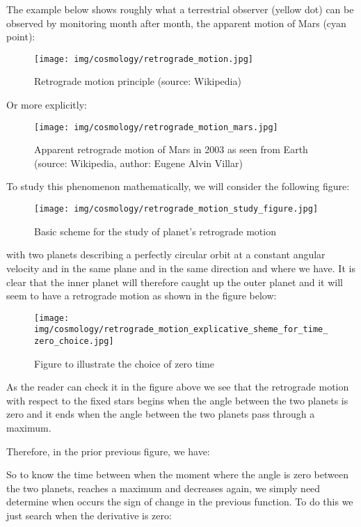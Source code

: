 	The example below shows roughly what a terrestrial observer (yellow dot) can be observed by monitoring month after month, the apparent motion of Mars (cyan point):
	\begin{figure}[H]
		\begin{center}
		\texttt{[image: img/cosmology/retrograde\_motion.jpg]}
		\end{center}	
		\caption[Retrograde motion principle]{Retrograde motion principle (source: Wikipedia)}
	\end{figure}
	Or more explicitly:
	\begin{figure}[H]
		\begin{center}
		\texttt{[image: img/cosmology/retrograde\_motion\_mars.jpg]}
		\end{center}	
		\caption[Apparent retrograde motion of Mars in 2003 as seen from Earth]{Apparent retrograde motion of Mars in 2003 as seen from Earth (source: Wikipedia, author: Eugene Alvin Villar)}
	\end{figure}
	To study this phenomenon mathematically, we will consider the following figure:
	\begin{figure}[H]
		\begin{center}
		\texttt{[image: img/cosmology/retrograde\_motion\_study\_figure.jpg]}
		\end{center}	
		\caption{Basic scheme for the study of planet's retrograde motion}
	\end{figure}
	with two planets describing a perfectly circular orbit at a constant angular velocity and in the same plane and in the same direction and where we have. It is clear that the inner planet will therefore caught up the outer planet and it will seem to have a retrograde motion as shown in the figure below:
	\begin{figure}[H]
		\begin{center}
		\texttt{[image: img/cosmology/retrograde\_motion\_explicative\_sheme\_for\_time\_zero\_choice.jpg]}
		\end{center}	
		\caption[]{Figure to illustrate the choice of zero time}
	\end{figure}
	As the reader can check it in the figure above we see that the retrograde motion with respect to the fixed stars begins when the angle between the two planets is zero and it ends when the angle between the two planets pass through a maximum.

	Therefore, in the prior previous figure, we have:
	
	So to know the time between when the moment where the angle is zero between the two planets, reaches a maximum and decreases again, we simply need determine when occurs the sign of change in the previous function. To do this we just search when the derivative is zero:
	
